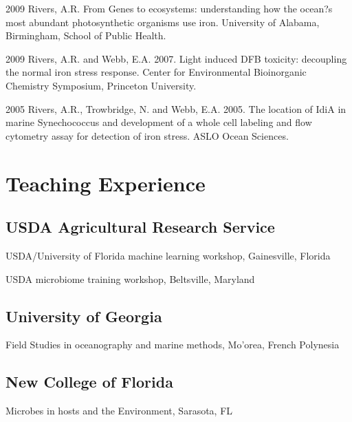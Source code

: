 \documentclass[12pt,letterpaper]{report}
\newcommand{\listitemspace}{0.15em}
\renewenvironment{itemize}
{\begin{list}{}{\setlength{\leftmargin}{0em}
            \setlength{\parskip}{0em}
            \setlength{\itemsep}{\listitemspace}
            \setlength{\parsep}{\listitemspace}}}
    {\end{list}}
\begin{document}
\begin{tablist}
\item[2009] \tab Rivers, A.R. From Genes to ecosystems: understanding how the ocean?s most abundant photosynthetic organisms use iron. University of Alabama, Birmingham, School of Public Health.

\item[2009] \tab Rivers, A.R. and Webb, E.A. 2007. Light induced DFB toxicity: decoupling the normal iron stress response. Center for Environmental Bioinorganic Chemistry Symposium, Princeton University. 

\item[2005] \tab Rivers, A.R., Trowbridge, N. and Webb, E.A. 2005. The location of IdiA in marine Synechococcus and development of a whole cell labeling and flow cytometry assay for detection of iron stress. ASLO Ocean Sciences.

		

    \end{tablist}





    \section*{Teaching Experience}

    \subsection*{USDA Agricultural Research Service}  
    \begin{itemize} 	
    	\item USDA/University of Florida machine learning workshop, Gainesville, Florida
    	\item USDA microbiome training workshop, Beltsville, Maryland
	\end{itemize}
    	
    \subsection*{University of Georgia}
        \begin{itemize}
    	\item Field Studies in oceanography and marine methods, Mo'orea, French Polynesia
	\end{itemize}

    \subsection*{New College of Florida}
            \begin{itemize}
    	\item Microbes in hosts and the Environment, Sarasota, FL
	\end{itemize}
\end{document}
